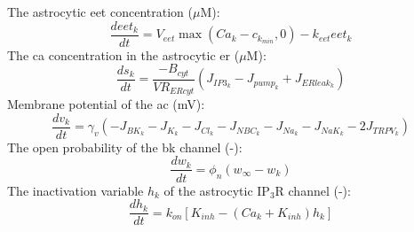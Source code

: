 \documentclass[11pt]{elsarticle}
\newcommand{\uM}{$\mu$M\xspace}
\newcommand{\ca}{\gls{ca}\xspace}
\begin{document}
%
The astrocytic \gls{eet} concentration (\uM):
\begin{equation}
\frac{d eet_k}{dt} = V_{eet} \max(Ca_k - c_{k_{min}}, 0) - k_{eet} eet_k
\end{equation}
%
The \ca concentration in the astrocytic \gls{er} (\uM):
\begin{equation}
\frac{d s_k}{dt} =  \frac{ -B_{cyt} }{VR_{ERcyt}} \left( J_{IP3_k} - J_{pump_k} + J_{ERleak_k} \right)
\end{equation}
%
Membrane potential of the \gls{ac} (mV):
\begin{equation} \label{eq:v_k}
\frac{d v_k}{dt} = \gamma_v ( -J_{BK_k} - J_{K_k} - J_{Cl_k} - J_{NBC_k} - J_{Na_k} - J_{NaK_k} - 2J_{TRPV_k})
\end{equation}
%
The open probability of the \gls{bk} channel (-):
\begin{equation}
\frac{d w_k}{dt} = \phi_n ( w_{\infty} - w_k)
\end{equation} 
%
The inactivation variable $h_k$ of the astrocytic IP$_3$R channel (-):
\begin{equation}
\frac{d h_k}{dt} = k_{on} \left[ K_{inh} - (Ca_k + K_{inh}) h_k \right]
\end{equation}
\end{document}

